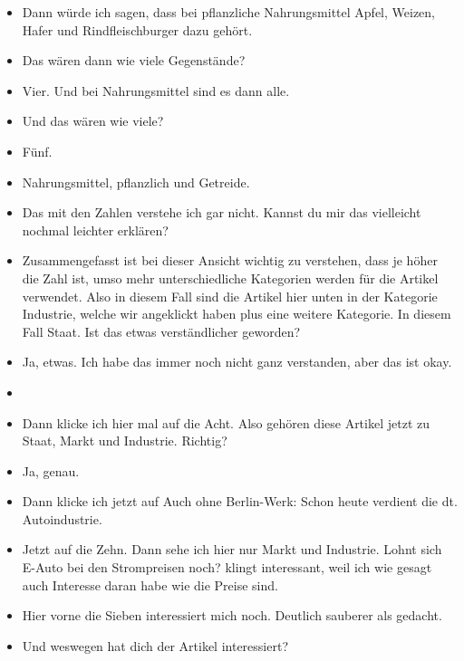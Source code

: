 {\begin{itemize}[]
            \item {} Dann würde ich sagen, dass bei pflanzliche Nahrungsmittel Apfel, Weizen, Hafer und Rindfleischburger dazu gehört.
            \item {} Das wären dann wie viele Gegenstände?
            \item {} Vier. Und bei Nahrungsmittel sind es dann alle.
            \item {} Und das wären wie viele?
            \item {} Fünf.
            \item {} Nahrungsmittel, pflanzlich und Getreide.
            \item {} Das mit den Zahlen verstehe ich gar nicht.
                  Kannst du mir das vielleicht nochmal leichter erklären?
            \item {} Zusammengefasst ist bei dieser Ansicht wichtig zu verstehen, dass je höher die Zahl ist, umso mehr unterschiedliche Kategorien werden für die Artikel verwendet.
                  Also in diesem Fall sind die Artikel hier unten in der Kategorie Industrie, welche wir angeklickt haben plus eine weitere Kategorie.
                  In diesem Fall Staat.
                  Ist das etwas verständlicher geworden?
            \item {} Ja, etwas.
                  Ich habe das immer noch nicht ganz verstanden, aber das ist okay.
            \item {}
            \item {} Dann klicke ich hier mal auf die Acht.
                  Also gehören diese Artikel jetzt zu Staat, Markt und Industrie. Richtig?
            \item {} Ja, genau.
            \item {} Dann klicke ich jetzt auf \flqq Auch ohne Berlin-Werk: Schon heute verdient die dt. Autoindustrie\frqq{}.
            \item {} Jetzt auf die Zehn.
                  Dann sehe ich hier nur Markt und Industrie.
                  \flqq Lohnt sich E-Auto bei den Strompreisen noch?\frqq{} klingt interessant, weil ich wie gesagt auch Interesse daran habe wie die Preise sind.
            \item {} Hier vorne die Sieben interessiert mich noch.
                  \flqq Deutlich sauberer als gedacht\frqq{}.
            \item {} Und weswegen hat dich der Artikel interessiert?

\end{itemize}}
